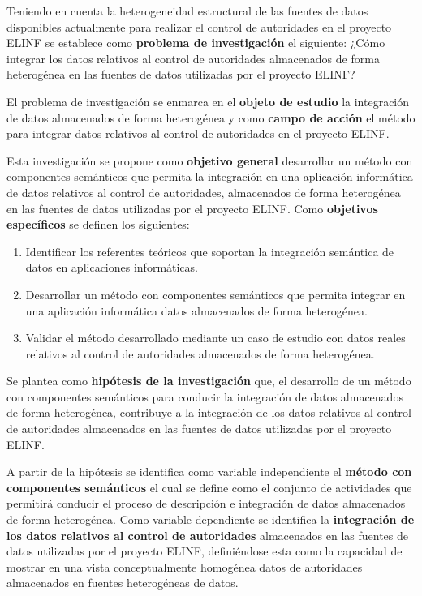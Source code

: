 Teniendo en cuenta la heterogeneidad estructural de las fuentes de datos disponibles actualmente para realizar el control de autoridades en el proyecto ELINF se establece como \textbf{problema de investigación} el siguiente: ¿Cómo integrar los datos relativos al control de autoridades almacenados de forma heterogénea en las fuentes de datos utilizadas por el proyecto ELINF?

El problema de investigación se enmarca en el \textbf{objeto de estudio} la integración de datos almacenados de forma heterogénea y como \textbf{campo de acción} el método para integrar datos relativos al control de autoridades en el proyecto ELINF.

Esta investigación se propone como \textbf{objetivo general} desarrollar un método con componentes semánticos que permita la integración en una aplicación informática de datos relativos al control de autoridades, almacenados de forma heterogénea en las fuentes de datos utilizadas por el proyecto ELINF. Como \textbf{objetivos específicos} se definen los siguientes:

\begin{enumerate}
\item Identificar los referentes teóricos que soportan la integración semántica de datos en aplicaciones informáticas.
\item Desarrollar un método con componentes semánticos que permita integrar en una aplicación informática datos almacenados de forma heterogénea.
\item Validar el método desarrollado mediante un caso de estudio con datos reales relativos al control de autoridades almacenados de forma heterogénea.
\end{enumerate}

Se plantea como \textbf{hipótesis de la investigación} que, el desarrollo de un método con componentes semánticos para conducir la integración de datos almacenados de forma heterogénea, contribuye a la integración de los datos relativos al control de autoridades almacenados en las fuentes de datos utilizadas por el proyecto ELINF.

A partir de la hipótesis se identifica como variable independiente el \textbf{método con componentes semánticos} el cual se define como el conjunto de actividades \citep{Offermann2010} que permitirá conducir el proceso de descripción e integración de datos almacenados de forma heterogénea. Como variable dependiente se identifica la \textbf{integración de los datos relativos al control de autoridades} almacenados en las fuentes de datos utilizadas por el proyecto ELINF, definiéndose esta como la capacidad de mostrar en una vista conceptualmente homogénea datos de autoridades almacenados en fuentes heterogéneas de datos.


